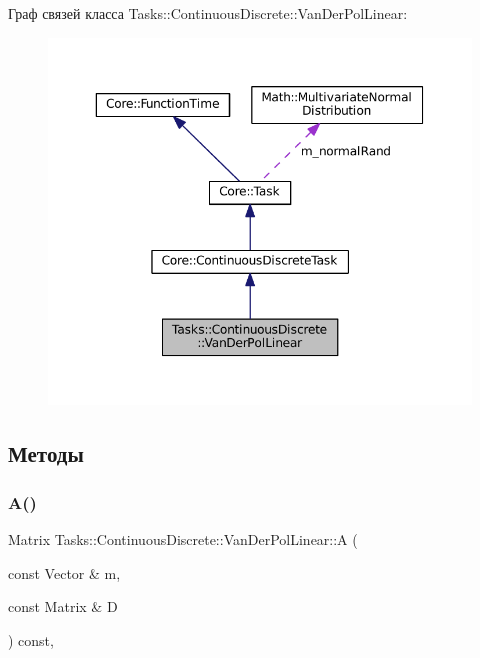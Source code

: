Граф связей класса Tasks\+:\+:Continuous\+Discrete\+:\+:Van\+Der\+Pol\+Linear\+:
\nopagebreak
\begin{figure}[H]
\begin{center}
\leavevmode
\includegraphics[width=350pt]{class_tasks_1_1_continuous_discrete_1_1_van_der_pol_linear__coll__graph}
\end{center}
\end{figure}


\subsection{Методы}
\hypertarget{class_tasks_1_1_continuous_discrete_1_1_van_der_pol_linear_abc0ead5ddd90702a5bbb93b07c74df85}{}\label{class_tasks_1_1_continuous_discrete_1_1_van_der_pol_linear_abc0ead5ddd90702a5bbb93b07c74df85} 
\subsubsection{\texorpdfstring{A()}{A()}}
{\footnotesize\ttfamily Matrix Tasks\+::\+Continuous\+Discrete\+::\+Van\+Der\+Pol\+Linear\+::A (\begin{DoxyParamCaption}\item[{const Vector \&}]{m,  }\item[{const Matrix \&}]{D }\end{DoxyParamCaption}) const\hspace{0.3cm}{\ttfamily [override]}, {\ttfamily [virtual]}}



